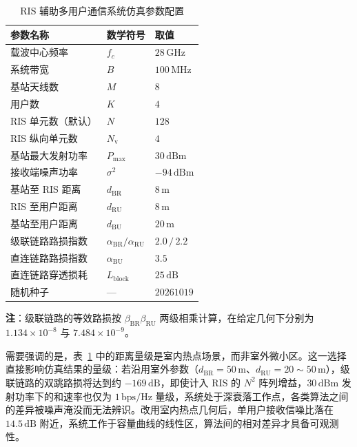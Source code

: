 \begin{table}[htbp]
  \centering
  \small
  \caption{RIS 辅助多用户通信系统仿真参数配置}
  \label{tab:sim_params}
  \begin{tabular*}{\textwidth}{@{\extracolsep{\fill}}lll@{}}
    \toprule
    \textbf{参数名称} & \textbf{数学符号} & \textbf{取值} \\
    \midrule
    载波中心频率            & $f_c$              & $28\,\mathrm{GHz}$ \\
    系统带宽                & $B$                & $100\,\mathrm{MHz}$ \\
    基站天线数              & $M$                & $8$ \\
    用户数                  & $K$                & $4$ \\
    RIS 单元数（默认）      & $N$                & $128$ \\
    RIS 纵向单元数          & $N_{\mathrm{v}}$   & $4$ \\
    基站最大发射功率        & $P_{\max}$         & $30\,\mathrm{dBm}$ \\
    接收端噪声功率          & $\sigma^{2}$       & $-94\,\mathrm{dBm}$ \\
    基站至 RIS 距离         & $d_{\mathrm{BR}}$  & $8\,\mathrm{m}$ \\
    RIS 至用户距离          & $d_{\mathrm{RU}}$  & $8\,\mathrm{m}$ \\
    基站至用户距离          & $d_{\mathrm{BU}}$  & $20\,\mathrm{m}$ \\
    级联链路路损指数        & $\alpha_{\mathrm{BR}}/\alpha_{\mathrm{RU}}$ & $2.0\,/\,2.2$ \\
    直连链路路损指数        & $\alpha_{\mathrm{BU}}$ & $3.5$ \\
    直连链路穿透损耗        & $L_{\mathrm{block}}$ & $25\,\mathrm{dB}$ \\
    随机种子                & ---                & $20261019$ \\
    \bottomrule
  \end{tabular*}
  \vspace{0.15cm}\par
  \noindent\footnotesize{
    \textbf{注}：级联链路的等效路损按 $\beta_{\mathrm{BR}}\beta_{\mathrm{RU}}$ 两级相乘计算，在给定几何下分别为 $1.134\times10^{-8}$ 与 $7.484\times10^{-9}$。
  }
\end{table}

需要强调的是，表~\ref{tab:sim_params} 中的距离量级是室内热点场景，而非室外微小区。这一选择直接影响仿真结果的量级：若沿用室外参数（$d_{\mathrm{BR}}=50\,\mathrm{m}$、$d_{\mathrm{RU}}=20\sim50\,\mathrm{m}$），级联链路的双跳路损将达到约 $-169\,\mathrm{dB}$，即使计入 RIS 的 $N^{2}$ 阵列增益，$30\,\mathrm{dBm}$ 发射功率下的和速率也仅为 $1\,\mathrm{bps/Hz}$ 量级，系统处于深衰落工作点，各类算法之间的差异被噪声淹没而无法辨识。改用室内热点几何后，单用户接收信噪比落在 $14.5\,\mathrm{dB}$ 附近，系统工作于容量曲线的线性区，算法间的相对差异才具备可观测性。

